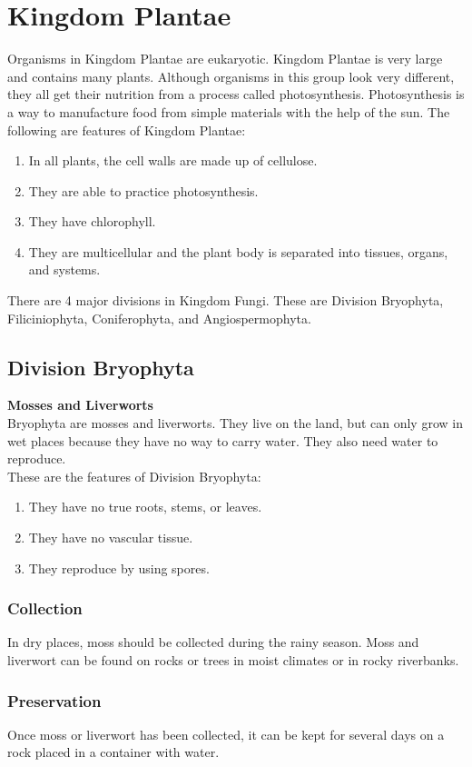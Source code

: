 \section{Kingdom Plantae}
Organisms in Kingdom Plantae are eukaryotic. Kingdom Plantae is very large and contains many plants.
Although organisms in this group look very different, they all get their nutrition from a process called photosynthesis. Photosynthesis is a way to manufacture food from simple materials with the help of the sun.
 The following are features of Kingdom Plantae:
\begin{enumerate}
\item{In all plants, the cell walls are made up of cellulose.}
\item{They are able to practice photosynthesis.}
\item{They have chlorophyll.}
\item{They are multicellular and the plant body is separated into tissues, organs, and systems.}
\end{enumerate}

There are 4 major divisions in Kingdom Fungi. These are Division Bryophyta, Filiciniophyta, Coniferophyta, and Angiospermophyta.
\subsection{Division Bryophyta}
\textbf{Mosses and Liverworts}\\
Bryophyta are mosses and liverworts. They live on the land, but can only grow in wet places because they have no way to carry water. They also need water to reproduce.\\
These are the features of Division Bryophyta:
\begin{enumerate}
\item{They have no true roots, stems, or leaves.}
\item{They have no vascular tissue.}
\item{They reproduce by using spores.}
\end{enumerate}

\subsubsection{Collection}
In dry places, moss should be collected during the rainy season. Moss and liverwort can be found on rocks or trees in moist climates or in rocky riverbanks. 

\subsubsection*{Preservation} 
Once moss or liverwort has been collected, it can be kept for several days on a rock placed in a container with water.

